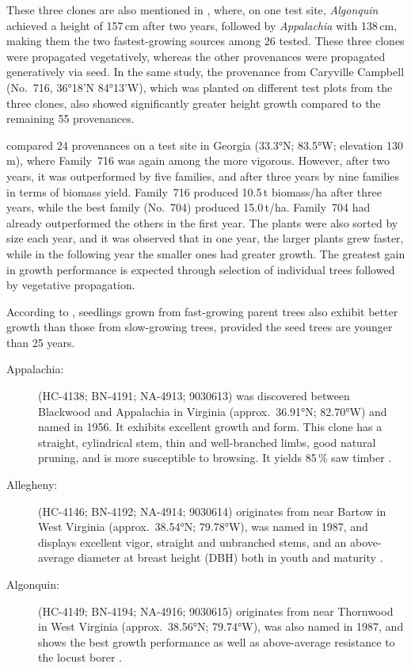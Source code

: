 These three clones are also mentioned in \citet{bridgen1988robinie}, where, on one test site, \emph{Algonquin} achieved a height of 157\,cm after two years, followed by \emph{Appalachia} with 138\,cm, making them the two fastest-growing sources among 26 tested. These three clones were propagated vegetatively, whereas the other provenances were propagated generatively via seed. In the same study, the provenance from Caryville Campbell (No.~716, 36°18'N 84°13'W), which was planted on different test plots from the three clones, also showed significantly greater height growth compared to the remaining 55 provenances.

\citet{bongarten1992robineSelektion} compared 24 provenances on a test site in Georgia (33.3°N; 83.5°W; elevation 130\,m), where Family~716 was again among the more vigorous. However, after two years, it was outperformed by five families, and after three years by nine families in terms of biomass yield. Family~716 produced 10.5\,t biomass/ha after three years, while the best family (No.~704) produced 15.0\,t/ha. Family~704 had already outperformed the others in the first year. The plants were also sorted by size each year, and it was observed that in one year, the larger plants grew faster, while in the following year the smaller ones had greater growth. The greatest gain in growth performance is expected through selection of individual trees followed by vegetative propagation.

According to \citet{cummings1947robinie}, seedlings grown from fast-growing parent trees also exhibit better growth than those from slow-growing trees, provided the seed trees are younger than 25 years.

\begin{description}
  \item[Appalachia:] (HC-4138; BN-4191; NA-4913; 9030613) was discovered between Blackwood and Appalachia in Virginia (approx.~36.91°N; 82.70°W) and named in 1956. It exhibits excellent growth and form. This clone has a straight, cylindrical stem, thin and well-branched limbs, good natural pruning, and is more susceptible to browsing. It yields 85\,\% saw timber \citep{steinergroup1987robinie,zsombor1980robinie,kapusi1995robinie}.
  
  \item[Allegheny:] (HC-4146; BN-4192; NA-4914; 9030614) originates from near Bartow in West Virginia (approx.~38.54°N; 79.78°W), was named in 1987, and displays excellent vigor, straight and unbranched stems, and an above-average diameter at breast height (DBH) both in youth and maturity \citep{steinergroup1987robinie}.
  
  \item[Algonquin:] (HC-4149; BN-4194; NA-4916; 9030615) originates from near Thornwood in West Virginia (approx.~38.56°N; 79.74°W), was also named in 1987, and shows the best growth performance as well as above-average resistance to the locust borer \citep{steinergroup1987robinie}.
\end{description}

